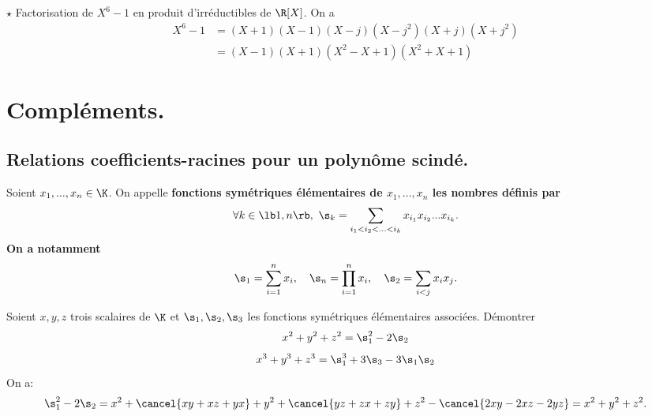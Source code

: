\documentclass[11pt]{article}
\begin{document}
\begin{ex}{$\star$}{}
    Factorisation de $X^6-1$ en produit d'irréductibles de $\R[X]$.
    \tcblower
    On a
    \begin{align*}
        X^6-1 &= (X+1)(X-1)(X-j)(X-j^2)(X+j)(X+j^2)\\
        &= (X-1)(X+1)(X^2-X+1)(X^2+X+1)
    \end{align*}
\end{ex}

\section{Compléments.}

\subsection{Relations coefficients-racines pour un polynôme scindé.}

\begin{defi}{}{}
    Soient $x_1,...,x_n\in\K$. On appelle \bf{fonctions symétriques élémentaires} de $x_1,...,x_n$ les nombres définis par
    \begin{equation*}
        \forall k \in \lb1,n\rb, ~ \s_k=\sum_{i_1<i_2<...<i_k}x_{i_1}x_{i_2}...x_{i_k}.
    \end{equation*}
    On a notamment
    \begin{equation*}
        \s_1=\sum_{i=1}^nx_i, \quad \s_n=\prod_{i=1}^n x_i, \quad \s_2=\sum_{i<j}x_ix_j.
    \end{equation*}
\end{defi}

\begin{ex}{}{}
    Soient $x,y,z$ trois scalaires de $\K$ et $\s_1,\s_2,\s_3$ les fonctions symétriques élémentaires associées. Démontrer
    \begin{equation*}
        x^2+y^2+z^2 = \s_1^2-2\s_2
    \end{equation*}
    \begin{equation*}
        x^3+y^3+z^3=\s_1^3+3\s_3-3\s_1\s_2
    \end{equation*}
    \tcblower
    On a:
    \begin{equation*}
        \s_1^2-2\s_2=x^2+\cancel{xy+xz+yx}+y^2+\cancel{yz+zx+zy}+z^2-\cancel{2xy-2xz-2yz}=x^2+y^2+z^2.
    \end{equation*}
\end{ex}

\vspace*{-0.3cm}
\end{document}
